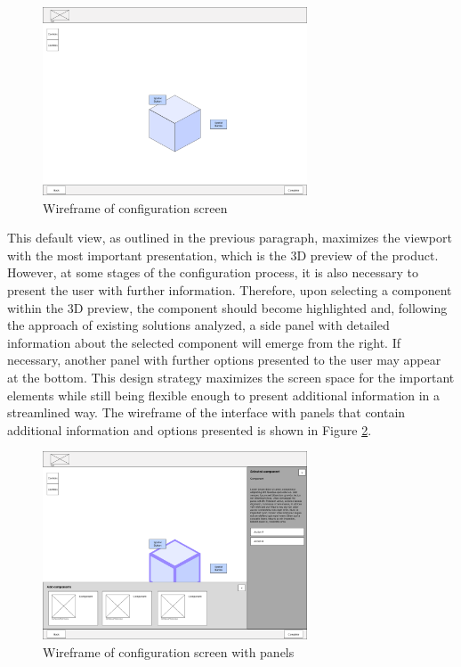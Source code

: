 \begin{figure}[h]
\centering
\includegraphics[width=0.7\textwidth]{images/wireframe_configuration_default.png}
\caption{Wireframe of configuration screen}
\label{fig:wireframe-configuration}
\end{figure}

This default view, as outlined in the previous paragraph, maximizes the viewport with the most important presentation, which is the 3D preview of the product. However, at some stages of the configuration process, it is also necessary to present the user with further information. Therefore, upon selecting a component within the 3D preview, the component should become highlighted and, following the approach of existing solutions analyzed, a side panel with detailed information about the selected component will emerge from the right. If necessary, another panel with further options presented to the user may appear at the bottom. This design strategy maximizes the screen space for the important elements while still being flexible enough to present additional information in a streamlined way. The wireframe of the interface with panels that contain additional information and options presented is shown in Figure \ref{fig:wireframe-configuration-panels}.

\begin{figure}[h]
\centering
\includegraphics[width=0.7\textwidth]{images/wireframe_configuration_panels.png}
\caption{Wireframe of configuration screen with panels}
\label{fig:wireframe-configuration-panels}
\end{figure}

